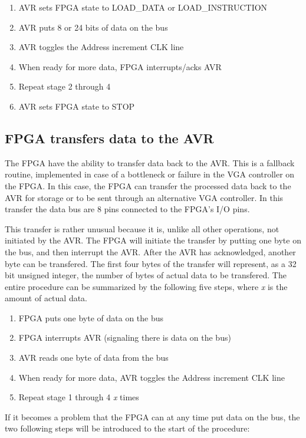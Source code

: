 \begin{enumerate}
\item AVR sets FPGA state to LOAD\_DATA or LOAD\_INSTRUCTION
\item AVR puts 8 or 24 bits of data on the bus
\item AVR toggles the Address increment CLK line
\item When ready for more data, FPGA interrupts/acks AVR 
\item Repeat stage 2 through 4
\item AVR sets FPGA state to STOP
\end{enumerate}

\subsection{FPGA transfers data to the AVR}
The FPGA have the ability to transfer data back to the AVR. This is a fallback routine, implemented in case of a bottleneck or failure in the VGA controller on the FPGA. In this case, the FPGA can transfer the processed data back to the AVR for storage or to be sent through an alternative VGA controller. In this transfer the data bus are 8 pins connected to the FPGA's I/O pins.

This transfer is rather unusual because it is, unlike all other operations, not initiated by the AVR. The FPGA will initiate the transfer by putting one byte on the bus, and then interrupt the AVR. After the AVR has acknowledged, another byte can be transfered. The first four bytes of the transfer will represent, as a 32 bit unsigned integer, the number of bytes of actual data to be transfered. The entire procedure can be summarized by the following five steps, where \emph{x} is the amount of actual data.

\begin{enumerate}
\item FPGA puts one byte of data on the bus
\item FPGA interrupts AVR (signaling there is data on the bus)
\item AVR reads one byte of data from the bus
\item When ready for more data, AVR toggles the Address increment CLK line
\item Repeat stage 1 through 4 \emph{x} times
\end{enumerate}

If it becomes a problem that the FPGA can at any time put data on the bus, the two following steps will be introduced to the start of the procedure: 

